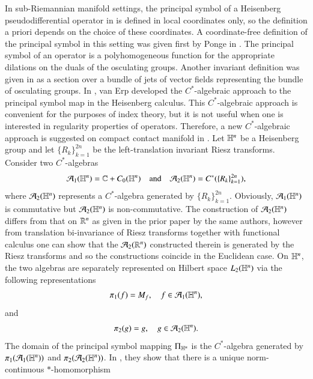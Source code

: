 \documentclass[leqno]{amsart}
\begin{document}
	In sub-Riemannian manifold settings, the principal symbol of a Heisenberg pseudodifferential operator in  \cite{BG88,Taylor84} is defined in local coordinates only, so the definition a priori depends on the choice of these coordinates. A coordinate-free definition of the principal symbol in this setting was given first by Ponge in \cite{Po08}. The principal symbol of an operator is a polyhomogeneous function for the appropriate dilations on the duals of the osculating groups.  Another invariant definition was given in \cite{EMbook,E04} as a section over a bundle of jets of vector fields representing the bundle of osculating groups. 
	In \cite{V2010b}, van Erp developed the $C^{\ast}$-algebraic approach to the principal symbol map in the Heisenberg calculus. This $C^{\ast}$-algebraic approach is convenient for the purposes of index theory, but it is not useful when one is interested in regularity properties of operators.  
	Therefore, a new $C^{\ast}$-algebraic approach is suggested on compact contact manifold in \cite{DAO4}. 
	Let $\mathbb{H}^{n}$ be a Heisenberg group and let $\{R_{k}\}_{k=1}^{2n}$ be the left-translation invariant Riesz transforms. Consider two $C^{*}$-algebras 
	$${\mathcal A}_{1}(\mathbb{H}^{n})=\mathbb{C}+C_{0}(\mathbb{H}^{n})\quad \mbox{and}\quad {\mathcal A}_{2}(\mathbb{H}^{n})=C^{*}(\{R_{k}\}_{k=1}^{2n}),$$ 
	where ${\mathcal A}_{2}(\mathbb{H}^{n})$ represents a $C^{*}$-algebra generated by $\{R_{k}\}_{k=1}^{2n}$.
	Obviously, ${\mathcal A}_{1}(\mathbb{H}^{n})$ is commutative but ${\mathcal A}_{2}(\mathbb{H}^{n})$ is non-commutative. The construction of ${\mathcal A}_{2}(\mathbb{H}^{n})$ differs from that on $\mathbb{R}^{n}$ as given in the prior paper \cite{DAO1} by the same authors, however from translation bi-invariance of Riesz transforms together with functional calculus one can show that the ${\mathcal A}_{2}(\mathbb{R}^{n})$ constructed therein is generated by the Riesz transforms and so the constructions coincide in the Euclidean case. %
	On $\mathbb{H}^{n}$, the two algebras are separately represented on Hilbert space $L_{2}(\mathbb{H}^{n})$ via the following representations
	\begin{align*}
		\pi_{1}(f)=M_{f},\quad f\in {\mathcal A}_{1}(\mathbb{H}^{n}),
	\end{align*}
	and
	\begin{align*}
		\pi_{2}(g)=g,\quad g\in {\mathcal A}_{2}(\mathbb{H}^{n}).
	\end{align*}
	The domain of the principal symbol mapping $\Pi_{\mathbb{H}^{n}}$ is the $C^{*}$-algebra generated by $\pi_{1}({\mathcal A}_{1}(\mathbb{H}^{n}))$ and $\pi_{2}({\mathcal A}_{2}(\mathbb{H}^{n}))$.
	In \cite{DAO4}, they show that there is a unique norm-continuous $*$-homomorphism
\end{document}

